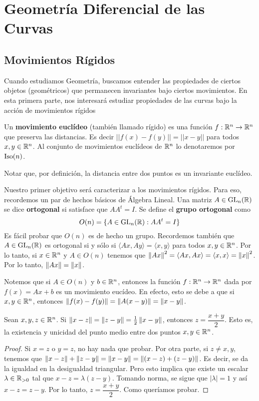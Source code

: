 \chapter{Geometría Diferencial de las Curvas}

\section{Movimientos Rígidos}

Cuando estudiamos Geometría, buscamos entender las propiedades de ciertos objetos (geométricos) que permanecen invariantes bajo ciertos movimientos. En esta primera parte, nos interesará estudiar propiedades de las curvas bajo la acción de movimientos rígidos

\begin{defn}
Un \textbf{movimiento euclídeo} (también llamado rígido) es una función $f:\mathbb{R}^n\to\mathbb{R}^n$ que preserva las distancias. Es decir $||f(x)-f(y)||=||x-y||$ para todos $x,y\in\mathbb{R}^n$. Al conjunto de movimientos euclídeos de $\mathbb{R}^n$ lo denotaremos por $\operatorname{Iso}(n)$.
\end{defn}

\begin{obs}
Notar que, por definición, la distancia entre dos puntos es un invariante euclídeo.
\end{obs}

Nuestro primer objetivo será caracterizar a los movimientos rígidos. Para eso, recordemos un par de hechos básicos de Álgebra Lineal. Una matriz $A\in\operatorname{GL}_n(\mathbb{R})$ se dice \textbf{ortogonal} si satisface que $AA^t=I$. Se define el \textbf{grupo ortogonal} como $$O(n)=\{A\in\operatorname{GL}_{n}(\mathbb{R}) : AA^{t}=I\}$$ Es fácil probar que $O(n)$ es de hecho un grupo. Recordemos también que $A\in\operatorname{GL}_n(\mathbb{R})$ es ortogonal si y sólo si $\langle Ax,Ay\rangle = \langle x,y\rangle$ para todos $x,y\in\mathbb{R}^n$. Por lo tanto, si $x\in\mathbb{R}^n$ y $A\in O(n)$ tenemos que $\left\| Ax \right\|^2 = \langle Ax,Ax\rangle = \langle x,x\rangle = \left\| x \right\|^2$. Por lo tanto, $\left\| Ax \right\|=\left\| x \right\|$.

Notemos que si $A\in O(n)$ y $b\in\mathbb{R}^n$, entonces la función $f:\mathbb{R}^n\to\mathbb{R}^n$ dada por $f(x)=Ax+b$ es un movimiento eucídeo. En efecto, esto se debe a que si $x,y\in\mathbb{R}^n$, entonces $\left\| f(x)-f(y) \right\| = \left\| A(x-y) \right\| = \left\| x-y \right\|$.

\begin{lem}
\label{lem::ptomedio}
Sean $x,y,z\in\mathbb{R}^n$. Si $\left\| x-z \right\| = \left\| z-y \right\| = \frac{1}{2}\left\| x-y \right\|$, entonces $z=\dfrac{x+y}{2}$. Esto es, la existencia y unicidad del punto medio entre dos puntos $x,y\in\mathbb{R}^n$.
\begin{proof}
Si $x=z$ o $y=z$, no hay nada que probar. Por otra parte, si $z\neq x,y$, tenemos que $\left\| x-z \right\|+\left\| z-y \right\| = \left\| x-y \right\| = \left\| (x-z)+(z-y) \right\|$. Es decir, se da la igualdad en la desigualdad triangular. Pero esto implica que existe un escalar $\lambda\in\mathbb{R}_{>0}$ tal que $x-z = \lambda(z-y)$. Tomando norma, se sigue que $|\lambda|=1$ y así $x-z=z-y$. Por lo tanto, $z=\dfrac{x+y}{2}$. Como queríamos probar.
\end{proof}
\end{lem}

